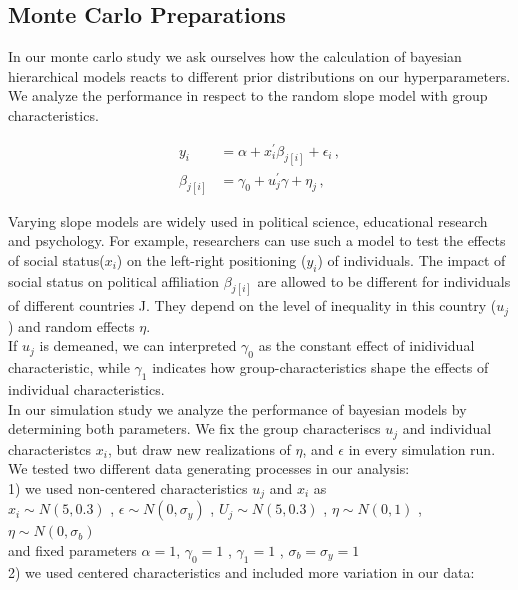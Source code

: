 \subsection{Monte Carlo Preparations}
In our monte carlo study we ask ourselves how the calculation of bayesian hierarchical models reacts to different prior distributions on our hyperparameters.
We analyze the performance in respect to the random slope model with group characteristics.

\begin{align}
  y_i &= \alpha+ x_i^\prime \beta_{j[i]} + \epsilon_i \,,\\
  \beta_{j[i]} &= \gamma_0 + u_j^\prime \gamma + \eta_j \,,
\end{align}

Varying slope models are widely used in political science, educational research and psychology. For example, \cite{snijders2012} researchers can use such a model to test the effects of social status($x_i$) on the left-right positioning ($y_i$) of individuals. The impact of social status on political affiliation $\beta_{j[i]}$ are allowed to be different for individuals of different countries J. They depend on the level of inequality in this country ($u_j$)  and random effects $\eta$.\\
If $u_j$ is demeaned, we can interpreted $\gamma_0$  as the constant effect of inidividual characteristic, while $\gamma_1$ indicates how group-characteristics shape the effects of individual characteristics.\\
In our simulation study we analyze the performance of bayesian models by determining both parameters. We fix the group characteriscs $u_j$ and individual characteristcs $x_i$, but draw new realizations of  $\eta$, and $\epsilon$ in every simulation run.\\

We tested two different data generating processes in our analysis: \\

1) we used non-centered characteristics $u_j$ and $x_i$ as\\

$x_i \sim N(5,0.3)$ , $\epsilon \sim N(0,\sigma_y) $ , $U_j \sim N(5,0.3)$ , $\eta \sim N(0,1) $ , $\eta \sim N(0,\sigma_b)$\\
and fixed parameters $\alpha=1$, $\gamma_0=1$ , $\gamma_1=1$ , $\sigma_b=\sigma_y=1$\\

2) we used centered characteristics and included more variation in our data: \\ 

